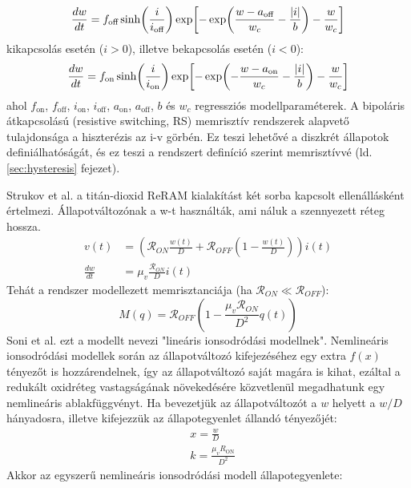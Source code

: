 \documentclass[twoside]{article}
\begin{document}
\begin{equation}\label{pickettoff}
	\frac{dw}{dt} = f_{\text{off}}\sinh\mleft(\frac{i}{i_{\text{off}}}\mright)\exp\mleft[-\exp\mleft(\frac{w-a_{\text{off}}}{w_c}-\frac{|i|}{b}\mright)-\frac{w}{w_c}\mright]
\end{equation}
kikapcsolás esetén ($i > 0$), illetve bekapcsolás esetén ($i < 0$):
\begin{equation}
	\frac{dw}{dt} = f_{\text{on}}\sinh\mleft(\frac{i}{i_{\text{on}}}\mright)\exp\mleft[-\exp\mleft(-\frac{w-a_{\text{on}}}{w_c}-\frac{|i|}{b}\mright)-\frac{w}{w_c}\mright]
\end{equation}
ahol $f_{\text{on}}$, $f_{\text{off}}$, $i_{\text{on}}$, $i_{\text{off}}$, $a_{\text{on}}$, $a_{\text{off}}$, $b$ és $w_c$ regressziós modellparaméterek.
A bipoláris átkapcsolású (resistive switching, RS) memrisztív rendszerek alapvető tulajdonsága a hiszterézis az i-v görbén. Ez teszi lehetővé a diszkrét állapotok definiálhatóságát, és ez teszi a rendszert definíció szerint memrisztívvé (ld. \ref{sec:hysteresis} fejezet). \par
Strukov et al. a titán-dioxid ReRAM kialakítást két sorba kapcsolt ellenállásként értelmezi. \cite{strukov2008} Állapotváltozónak a w-t használták, ami náluk a szennyezett réteg hossza. \begin{align}
	v(t) &= \left(\mathcal{R}_{ON}\frac{w(t)}{D} + \mathcal{R}_{OFF}\left(1 - \frac{w(t)}{D}\right)\right)i(t) \\
	\frac{dw}{dt} &= \mu_v \frac{\mathcal{R}_{ON}}{D} i(t)
\end{align}
Tehát a rendszer modellezett memrisztanciája (ha $\mathcal{R}_{ON} \ll \mathcal{R}_{OFF}$): \begin{equation}
	M(q) = \mathcal{R}_{OFF} \left(1- \frac{\mu_v \mathcal{R}_{ON}}{D^2}q(t)\right)
\end{equation}
Soni et al. ezt a modellt nevezi "lineáris ionsodródási modellnek"\cite{soni2022}. Nemlineáris ionsodródási modellek során az állapotváltozó kifejezéséhez egy extra $f(x)$ tényezőt is hozzárendelnek, így az állapotváltozó saját magára is kihat, ezáltal a redukált oxidréteg vastagságának növekedésére közvetlenül megadhatunk egy nemlineáris ablakfüggvényt. Ha bevezetjük az állapotváltozót a $w$ helyett a $w/D$ hányadosra, illetve kifejezzük az állapotegyenlet állandó tényezőjét:
\begin{align}
	&x = \frac{w}{D} \\
	&k = \frac{\mu_v R_{\text{ON}}}{D^2}
\end{align}
Akkor az egyszerű nemlineáris ionsodródási modell állapotegyenlete:
\end{document}

